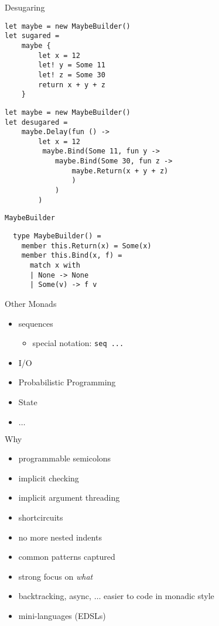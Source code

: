 \documentclass{beamer}
\begin{document}
\begin{frame}[fragile]{Desugaring}
  \small
  \begin{verbatim}
let maybe = new MaybeBuilder()
let sugared =
    maybe {
        let x = 12
        let! y = Some 11
        let! z = Some 30
        return x + y + z
    }
  \end{verbatim}
  \pause
  \begin{verbatim}
let maybe = new MaybeBuilder()
let desugared = 
    maybe.Delay(fun () ->
        let x = 12
         maybe.Bind(Some 11, fun y ->
            maybe.Bind(Some 30, fun z ->
                maybe.Return(x + y + z)
                )
            )
        )
  \end{verbatim}
\end{frame}

\begin{frame}[fragile]{\texttt{MaybeBuilder}}
  \begin{verbatim}
  type MaybeBuilder() =
    member this.Return(x) = Some(x)
    member this.Bind(x, f) =
      match x with
      | None -> None
      | Some(v) -> f v
  \end{verbatim}
\end{frame}

\begin{frame}{Other Monads}
  \begin{itemize}[<+->]
    \item sequences
    \begin{itemize}
      \item special notation: \texttt{seq \textbraceleft ... \textbraceright }
    \end{itemize}
    \item I/O
    \item Probabilistic Programming
    \item State
    \item $\ldots$
  \end{itemize}
\end{frame}

\begin{frame}{Why}
  \begin{itemize}[<+->]
    \item programmable semicolons
    \item implicit checking
    \item implicit argument threading
    \item shortcircuits
    \item no more nested indents
    \item common patterns captured
    \item strong focus on \textit{what}
    \item backtracking, async, $\ldots$ easier to code in monadic style
    \item mini-languages (EDSLs)
  \end{itemize}
\end{frame}
\end{document}
